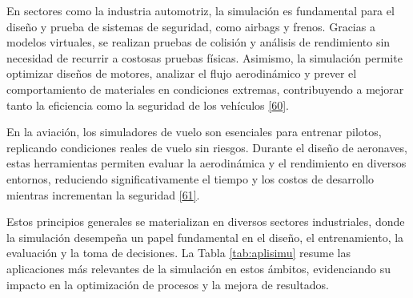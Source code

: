 \documentclass[12pt,oneside]{templates/unerthesis}
\begin{document}
En sectores como la industria automotriz, la simulación es fundamental para el diseño y prueba de sistemas de seguridad, como airbags y frenos. Gracias a modelos virtuales, se realizan pruebas de colisión y análisis de rendimiento sin necesidad de recurrir a costosas pruebas físicas. Asimismo, la simulación permite optimizar diseños de motores, analizar el flujo aerodinámico y prever el comportamiento de materiales en condiciones extremas, contribuyendo a mejorar tanto la eficiencia como la seguridad de los vehículos \protect\hyperlink{ref-stork_towards_2008}{{[}60{]}}.

En la aviación, los simuladores de vuelo son esenciales para entrenar pilotos, replicando condiciones reales de vuelo sin riesgos. Durante el diseño de aeronaves, estas herramientas permiten evaluar la aerodinámica y el rendimiento en diversos entornos, reduciendo significativamente el tiempo y los costos de desarrollo mientras incrementan la seguridad \protect\hyperlink{ref-jentsch_simulation_2017}{{[}61{]}}.

Estos principios generales se materializan en diversos sectores industriales, donde la simulación desempeña un papel fundamental en el diseño, el entrenamiento, la evaluación y la toma de decisiones. La Tabla \ref{tab:aplisimu} resume las aplicaciones más relevantes de la simulación en estos ámbitos, evidenciando su impacto en la optimización de procesos y la mejora de resultados.

\begin{table}[!h]
\centering
\caption{\label{tab:aplisimu}Aplicaciones de la simulación en distintos sectores}
\centering
{}
\end{table}
\end{document}
